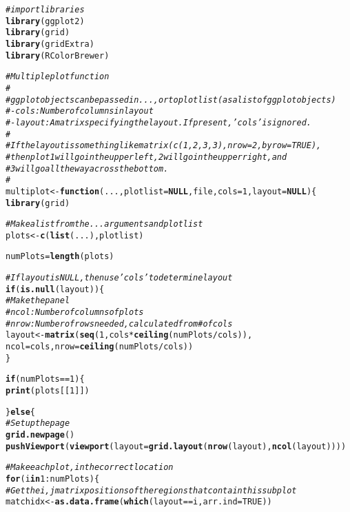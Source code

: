 \documentclass[fleqn,10pt]{olplainarticle}\usepackage[]{graphicx}\usepackage[]{color}
\makeatletter
\newcommand{\hlnum}[1]{\textcolor[rgb]{0.686,0.059,0.569}{#1}}%
\newcommand{\hlcom}[1]{\textcolor[rgb]{0.678,0.584,0.686}{\textit{#1}}}%
\newcommand{\hlopt}[1]{\textcolor[rgb]{0,0,0}{#1}}%
\newcommand{\hlstd}[1]{\textcolor[rgb]{0.345,0.345,0.345}{#1}}%
\newcommand{\hlkwa}[1]{\textcolor[rgb]{0.161,0.373,0.58}{\textbf{#1}}}%
\newcommand{\hlkwb}[1]{\textcolor[rgb]{0.69,0.353,0.396}{#1}}%
\newcommand{\hlkwc}[1]{\textcolor[rgb]{0.333,0.667,0.333}{#1}}%
\newcommand{\hlkwd}[1]{\textcolor[rgb]{0.737,0.353,0.396}{\textbf{#1}}}%
\newenvironment{kframe}{%
 \def\at@end@of@kframe{}%
 \ifinner\ifhmode%
  \def\at@end@of@kframe{\end{minipage}}%
  \begin{minipage}{\columnwidth}%
 \fi\fi%
 \def\FrameCommand##1{\hskip\@totalleftmargin \hskip-\fboxsep
 \colorbox{shadecolor}{##1}\hskip-\fboxsep
     \hskip-\linewidth \hskip-\@totalleftmargin \hskip\columnwidth}%
 \MakeFramed {\advance\hsize-\width
   \@totalleftmargin\z@ \linewidth\hsize
   \@setminipage}}%
 {\par\unskip\endMakeFramed%
 \at@end@of@kframe}
\newenvironment{knitrout}{}{} %
\makeatother
\begin{document}
\begin{appendices}
\begin{knitrout}
\begin{kframe}
\begin{alltt}
\hlcom{# import libraries}
\hlkwd{library}\hlstd{(ggplot2)}
\hlkwd{library}\hlstd{(grid)}
\hlkwd{library}\hlstd{(gridExtra)}
\hlkwd{library}\hlstd{(RColorBrewer)}


\hlcom{# Multiple plot function}
\hlcom{#}
\hlcom{# ggplot objects can be passed in ..., or to plotlist (as a list of ggplot objects)}
\hlcom{# - cols:   Number of columns in layout}
\hlcom{# - layout: A matrix specifying the layout. If present, 'cols' is ignored.}
\hlcom{#}
\hlcom{# If the layout is something like matrix(c(1,2,3,3), nrow=2, byrow=TRUE),}
\hlcom{# then plot 1 will go in the upper left, 2 will go in the upper right, and}
\hlcom{# 3 will go all the way across the bottom.}
\hlcom{#}
\hlstd{multiplot} \hlkwb{<-} \hlkwa{function}\hlstd{(}\hlkwc{...}\hlstd{,} \hlkwc{plotlist}\hlstd{=}\hlkwa{NULL}\hlstd{,} \hlkwc{file}\hlstd{,} \hlkwc{cols}\hlstd{=}\hlnum{1}\hlstd{,} \hlkwc{layout}\hlstd{=}\hlkwa{NULL}\hlstd{) \{}
  \hlkwd{library}\hlstd{(grid)}

  \hlcom{# Make a list from the ... arguments and plotlist}
  \hlstd{plots} \hlkwb{<-} \hlkwd{c}\hlstd{(}\hlkwd{list}\hlstd{(...), plotlist)}

  \hlstd{numPlots} \hlkwb{=} \hlkwd{length}\hlstd{(plots)}

  \hlcom{# If layout is NULL, then use 'cols' to determine layout}
  \hlkwa{if} \hlstd{(}\hlkwd{is.null}\hlstd{(layout)) \{}
    \hlcom{# Make the panel}
    \hlcom{# ncol: Number of columns of plots}
    \hlcom{# nrow: Number of rows needed, calculated from # of cols}
    \hlstd{layout} \hlkwb{<-} \hlkwd{matrix}\hlstd{(}\hlkwd{seq}\hlstd{(}\hlnum{1}\hlstd{, cols} \hlopt{*} \hlkwd{ceiling}\hlstd{(numPlots}\hlopt{/}\hlstd{cols)),}
                     \hlkwc{ncol} \hlstd{= cols,} \hlkwc{nrow} \hlstd{=} \hlkwd{ceiling}\hlstd{(numPlots}\hlopt{/}\hlstd{cols))}
  \hlstd{\}}

  \hlkwa{if} \hlstd{(numPlots}\hlopt{==}\hlnum{1}\hlstd{) \{}
    \hlkwd{print}\hlstd{(plots[[}\hlnum{1}\hlstd{]])}

  \hlstd{\}} \hlkwa{else} \hlstd{\{}
    \hlcom{# Set up the page}
    \hlkwd{grid.newpage}\hlstd{()}
    \hlkwd{pushViewport}\hlstd{(}\hlkwd{viewport}\hlstd{(}\hlkwc{layout} \hlstd{=} \hlkwd{grid.layout}\hlstd{(}\hlkwd{nrow}\hlstd{(layout),} \hlkwd{ncol}\hlstd{(layout))))}

    \hlcom{# Make each plot, in the correct location}
    \hlkwa{for} \hlstd{(i} \hlkwa{in} \hlnum{1}\hlopt{:}\hlstd{numPlots) \{}
      \hlcom{# Get the i,j matrix positions of the regions that contain this subplot}
      \hlstd{matchidx} \hlkwb{<-} \hlkwd{as.data.frame}\hlstd{(}\hlkwd{which}\hlstd{(layout} \hlopt{==} \hlstd{i,} \hlkwc{arr.ind} \hlstd{=} \hlnum{TRUE}\hlstd{))}


\end{alltt}
\end{kframe}
\end{knitrout}
\end{appendices}
\end{document}
